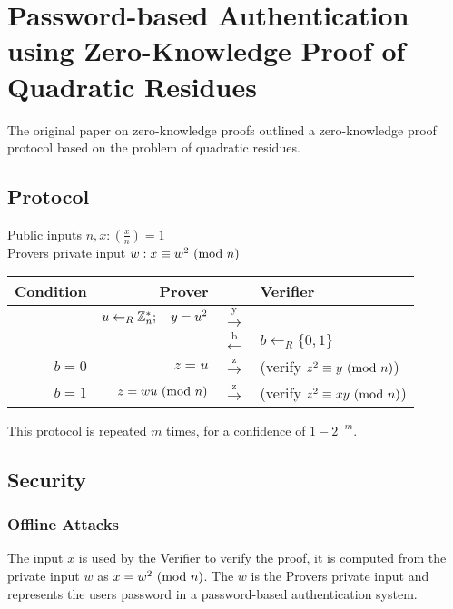 \section{Password-based Authentication using Zero-Knowledge Proof of Quadratic Residues}

The original paper on zero-knowledge proofs outlined a zero-knowledge proof protocol based on the problem of quadratic residues.

\subsection{Protocol} %

Public inputs $n,x: (\frac{x}{n}) = 1$\\
Provers private input $w: x \equiv w^2 \ (\mathrm{mod}\ n)$\\

\begin{center}
	\begin{tabular}{rrcl}
		Condition & Prover & & Verifier\\
		\hline
		& $u \leftarrow_R \Bbb{Z}_{n}^{*}; \quad y = u^2$ & $\xrightarrow{\text{y}}$ \\
		&& $\xleftarrow{\text{b}}$ & $b \leftarrow_R \{0, 1\} $ \\
		$b = 0$ & $ z = u$ & $ \xrightarrow{\text{z}}$ & (verify $z^2 \equiv y \ (\mathrm{mod}\ n)$)\\
		$b = 1$ & $ z = wu \ (\mathrm{mod}\ n)$ & $ \xrightarrow{\text{z}}$ & (verify $z^2 \equiv xy \ (\mathrm{mod}\ n)$)\\ %
	\end{tabular}
\end{center}

This protocol is repeated $m$ times, for a confidence of $1 - 2^{-m}$.

\subsection{Security}

\subsubsection{Offline Attacks}
The input $x$ is used by the Verifier to verify the proof, it is computed from the private input $w$ as $x = w^2 \ (\mathrm{mod}\ n)$.
The $w$ is the Provers private input and represents the users password in a password-based authentication system.

